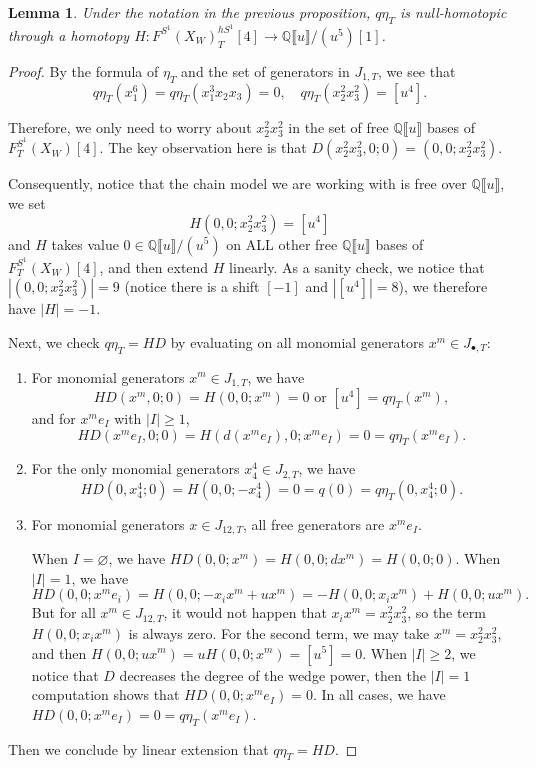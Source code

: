 \documentclass[11pt]{amsart}
\numberwithin{equation}{section}
\theoremstyle{plain}
\newtheorem{Lemma}[lemma]{Lemma}
\theoremstyle{definition}
\theoremstyle{remark}
\newcommand{\bQ} { {\mathbb{Q}}}
\newcommand{\fpw}[1]{{\llbracket #1\rrbracket}}
\begin{document}
\begin{Lemma}\label{lemma:counterexample nullhomotopy}Under the notation in the previous proposition, $q\eta_T$ is null-homotopic through a homotopy $H: F^{S^1}(X_W)_T^{hS^1}[4] \to \bQ\fpw{u}/(u^5)[1]$.
\end{Lemma}
\begin{proof}
By the formula of $\eta_T$ and the set of generators in $J_{1,T}$, we see that 
\[ q\eta_T  (x_1^6)=q\eta_T(x_1^3x_2x_3)=0,\quad q\eta_T(x_2^2x_3^2)=[u^4].\]


Therefore, we only need to worry about $x_2^2x_3^2$ in the set of free $\bQ\fpw{u}$ bases of $F_T^{S^1}(X_{W})[4] $. The key observation here is that $D(x_2^2x_3^2,0;0)=(0,0;x_2^2x_3^2)$. 

Consequently, notice that the chain model we are working with is free over $\bQ\fpw{u}$, we set
\[H(0,0;x_2^2x_3^2)=[u^4]\]
and $H$ takes value $0 \in \bQ\fpw{u}/(u^5)$ on ALL other free $\bQ\fpw{u}$ bases of $F_T^{S^1}(X_W)[4] $, and then extend $H$ linearly. As a sanity check, we notice that $|(0,0;x_2^2x_3^2)|=9$ (notice there is a shift $[-1]$ and $|[u^4]|=8$), we therefore have $|H|=-1$. 

Next, we check $q\eta_T=HD$ by evaluating on all monomial generators $x^m\in J_{\bullet,T}$: 
\begin{enumerate}[fullwidth]
\item For monomial generators $x^m\in J_{1,T}$, we have
\[HD(x^m,0;0)=H(0,0;x^m)= 0 \text{ or } [u^4] = q\eta_T(x^m),\]
and for $x^m e_I$ with $|I|\geq 1$, 
\[HD(x^me_I,0;0)=H(d(x^me_I),0;x^me_I)= 0  = q\eta_T(x^me_I).\]
\item For the only monomial generators $x_4^4\in J_{2,T}$, we have 
\[HD(0,x_4^4;0)=H(0,0;-x_4^4)= 0 = q(0)=q\eta_T(0,x_4^4;0).\]

\item  For monomial generators $x\in J_{12,T}$, all free generators are $x^m e_I$.

When $I=\varnothing$, we have $HD(0,0;x^m)=H(0,0;dx^m)=H(0,0;0)$. When $|I|=1$, we have
\[HD(0,0;x^me_i)=H(0,0;-x_ix^m+ux^m)=-H(0,0;x_ix^m)+H(0,0;ux^m).\]
But for all $x^m\in J_{12,T}$, it would not happen that $x_ix^m= x_2^2x_3^2$, so the term $H(0,0;x_ix^m)$ is always zero. For the second term, we may take $x^m=x_2^2x_3^2$, and then $H(0,0;ux^m)=uH(0,0;x^m)=[u^5]=0$. When $|I|\geq 2$, we notice that $D$ decreases the degree of the wedge power, then the $|I|=1$ computation shows that $HD(0,0;x^me_I)=0$. In all cases, we have $HD (0,0; x^me_I)=0=q\eta_T(x^me_I)$.
\end{enumerate}
Then we conclude by linear extension that $q\eta_T=HD$. 
\end{proof}
\end{document}
